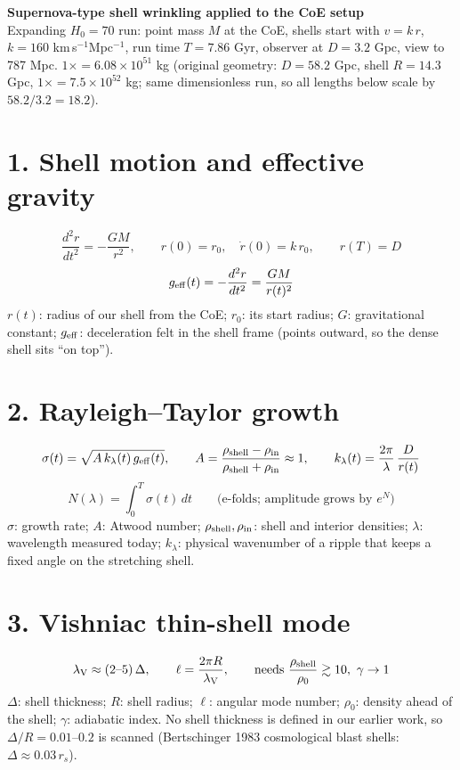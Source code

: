 \documentclass[11pt]{article}
\begin{document}
{\Large\bf Supernova-type shell wrinkling applied to the CoE setup}\\[2pt]
Expanding $H_0=70$ run: point mass $M$ at the CoE, shells start with $v=k\,r$, $k=160$ km\,s$^{-1}$Mpc$^{-1}$, run time $T=7.86$ Gyr, observer at $D=3.2$ Gpc, view to 787 Mpc. $1\times = 6.08\times10^{51}$ kg (original geometry: $D=58.2$ Gpc, shell $R=14.3$ Gpc, $1\times=7.5\times10^{52}$ kg; same dimensionless run, so all lengths below scale by $58.2/3.2=18.2$).

\section*{1. Shell motion and effective gravity}
\[ \frac{d^2r}{dt^2} = -\frac{G M}{r^2}, \qquad r(0)=r_0,\quad \dot r(0)=k\,r_0, \qquad r(T)=D \]
\[ g_{\rm eff}(t) = -\frac{d^2 r}{dt^2} = \frac{G M}{r(t)^2} \]
$r(t)$: radius of our shell from the CoE; $r_0$: its start radius; $G$: gravitational constant; $g_{\rm eff}$: deceleration felt in the shell frame (points outward, so the dense shell sits ``on top'').

\section*{2. Rayleigh--Taylor growth}
\[ \sigma(t) = \sqrt{A\,k_\lambda(t)\,g_{\rm eff}(t)}, \qquad A=\frac{\rho_{\rm shell}-\rho_{\rm in}}{\rho_{\rm shell}+\rho_{\rm in}}\approx 1, \qquad k_\lambda(t)=\frac{2\pi}{\lambda}\,\frac{D}{r(t)} \]
\[ N(\lambda) = \int_0^T \sigma(t)\,dt \qquad\text{(e-folds; amplitude grows by } e^{N}) \]
$\sigma$: growth rate; $A$: Atwood number; $\rho_{\rm shell},\rho_{\rm in}$: shell and interior densities; $\lambda$: wavelength measured today; $k_\lambda$: physical wavenumber of a ripple that keeps a fixed angle on the stretching shell.

\section*{3. Vishniac thin-shell mode}
\[ \lambda_{\rm V} \approx (2\text{--}5)\,\Delta, \qquad \ell = \frac{2\pi R}{\lambda_{\rm V}}, \qquad \text{needs } \frac{\rho_{\rm shell}}{\rho_0}\gtrsim 10,\ \gamma\to1 \]
$\Delta$: shell thickness; $R$: shell radius; $\ell$: angular mode number; $\rho_0$: density ahead of the shell; $\gamma$: adiabatic index. No shell thickness is defined in our earlier work, so $\Delta/R=0.01$--$0.2$ is scanned (Bertschinger 1983 cosmological blast shells: $\Delta\approx0.03\,r_s$).
\end{document}

